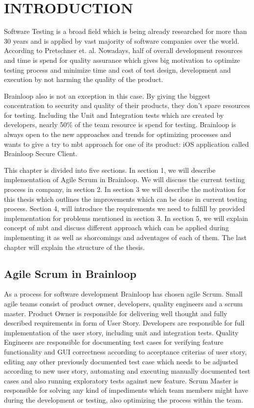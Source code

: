 \chapter{INTRODUCTION}
\label{chapter:introduction}

Software Testing is a broad field which is being already researched for more than 30 years and is applied by vast majority of software companies over the world. According to Pretschner et. al. Nowadays, half of overall development resources and time is spend for quality assurance which gives big motivation to optimize testing process and minimize time and cost of test design, development and execution by not harming the quality of the product.

Brainloop also is not an exception in this case. By giving the biggest concentration to security and quality of their products, they don't spare resources for testing. Including the Unit and Integration tests which are created by developers, nearly 50\% of the team resource is spend for testing. Brainloop is always open to the new approaches and trends for optimizing processes and wants to give a try to \acrlong{mbt} approach for one of its product: iOS application called Brainloop Secure Client.

This chapter is divided into five sections. In section 1, we will describe implementation of Agile Scrum in Brainloop. We will discuss the current testing process in company, in section 2. In section 3 we will describe the motivation for this thesis which outlines the improvements which can be done in current testing process. Section 4, will introduce the requirements we need to fulfill by provided implementation for problems mentioned in section 3. In section 5, we will explain concept of \acrlong{mbt} and discuss different approach which can be applied during implementing it as well as shorcomings and adventages of each of them. The last chapter will explain the structure of the thesis.

\section{Agile Scrum in Brainloop}

As a process for software development Brainloop has chosen agile Scrum. Small agile teams consist of product owner, developers, quality engineers and a scrum master. Product Owner is responsible for delivering well thought and fully described requirements in form of User Story. Developers are responsible for full implementation of the user story, including unit and integration tests. Quality Engineers are responsible for documenting test cases for verifying feature functionality and GUI correctness according to acceptance criterias of user story, editing any other previously documented test case which needs to be adjusted according to new user story, automating and executing manually documented test cases and also running exploratory tests against new feature. Scrum Master is responsible for solving any kind of impediments which team members might have during the development or testing, also optimizing the process within the team.

